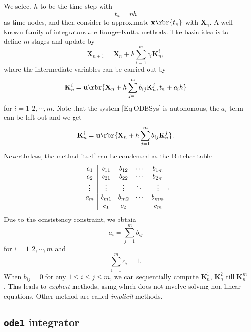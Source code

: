 \documentclass[english, nochinese]{pnote}
\begin{document}
We select $h$ to be the time step with
\begin{equation}
t_n = n h
\end{equation}
as time nodes, and then consider to approximate $ \mathbf{x} \rbr{t_n} $ with $ \mathbf{X}_n $. A well-known family of integrators are Runge--Kutta methods. The basic idea is to define $m$ stages and update by
\begin{equation}
\mathbf{X}_{ n + 1 } = \mathbf{X}_n + h \sum_{ i = 1 }^m c_i \mathbf{K}_n^{i},
\end{equation}
where the intermediate variables can be carried out by
\begin{equation}
\mathbf{K}_n^i = \mathbf{u} \rbr{ \mathbf{X}_n + h \sum_{ j = 1 }^m b_{ i j } \mathbf{K}_n^j, t_n + a_i h }
\end{equation}
for $ i = 1, 2, \cdots, m $. Note that the system \eqref{Eq:ODESys} is autonomous, the $a_i$ term can be left out and we get
\begin{equation}
\mathbf{K}_n^i = \mathbf{u} \rbr{ \mathbf{X}_n + h \sum_{ j = 1 }^m b_{ i j } \mathbf{K}_n^j }.
\end{equation}
Nevertheless, the method itself can be condensed as the Butcher table
\begin{equation}
\begin{array}{c|cccc}
a_1 & b_{ 1 1 } & b_{ 1 2 } & \cdots & b_{ 1 m } \\
a_2 & b_{ 2 1 } & b_{ 2 2 } & \cdots & b_{ 2 m } \\
\vdots & \vdots & \vdots & \ddots & \vdots \\
a_m & b_{ m 1 } & b_{ m 2 } & \cdots & b_{ m m } \\
\hline
& c_1 & c_2 & \cdots & c_m
\end{array}
.
\end{equation}
Due to the consistency constraint, we obtain
\begin{equation}
a_i = \sum_{ j = 1 }^m b_{ i j }
\end{equation}
for $ i = 1, 2, \cdots, m $ and
\begin{equation}
\sum_{ i = 1 }^m c_i = 1.
\end{equation}
When $ b_{ i j } = 0 $ for any $ 1 \le i \le j \le m $, we can sequentially compute $\mathbf{K}_n^1$, $\mathbf{K}_n^2$ till $\mathbf{K}_n^m$. This leads to \emph{explicit} methods, using which does not involve solving non-linear equations. Other method are called \emph{implicit} methods.

\subsection{\texttt{ode1} integrator}
\end{document}
